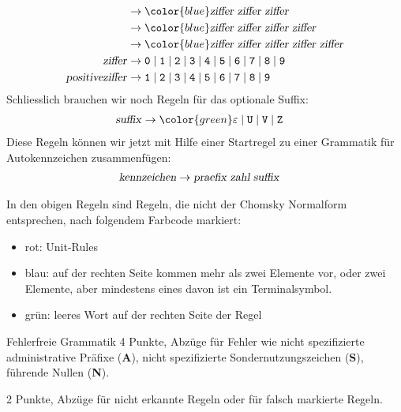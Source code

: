 \begin{loesung}
\begin{teilaufgaben}
\begin{align*}
&\rightarrow
{\color{blue}
\text{\textsl{ziffer}}\;
\text{\textsl{ziffer}}\;
\text{\textsl{ziffer}}}
\\
&\rightarrow
{\color{blue}
\text{\textsl{ziffer}}\;
\text{\textsl{ziffer}}\;
\text{\textsl{ziffer}}\;
\text{\textsl{ziffer}}}
\\
&\rightarrow
{\color{blue}
\text{\textsl{ziffer}}\;
\text{\textsl{ziffer}}\;
\text{\textsl{ziffer}}\;
\text{\textsl{ziffer}}\;
\text{\textsl{ziffer}}}
\\
\text{\textsl{ziffer}}
&\rightarrow
{\tt 0}\;|\;
{\tt 1}\;|\;
{\tt 2}\;|\;
{\tt 3}\;|\;
{\tt 4}\;|\;
{\tt 5}\;|\;
{\tt 6}\;|\;
{\tt 7}\;|\;
{\tt 8}\;|\;
{\tt 9}
\\
\text{\textsl{positiveziffer}}
&\rightarrow
{\tt 1}\;|\;
{\tt 2}\;|\;
{\tt 3}\;|\;
{\tt 4}\;|\;
{\tt 5}\;|\;
{\tt 6}\;|\;
{\tt 7}\;|\;
{\tt 8}\;|\;
{\tt 9}
\\
\end{align*}
Schliesslich brauchen wir noch Regeln für das optionale Suffix:
\begin{align*}
\text{\textsl{suffix}}
&\rightarrow{\color{green}\varepsilon} \;|\;
{\tt U} \;|\;
{\tt V} \;|\;
{\tt Z}
\end{align*}
Diese Regeln können wir jetzt mit Hilfe einer Startregel zu einer
Grammatik für Autokennzeichen zusammenfügen:
\begin{align*}
\text{\textsl{kennzeichen}}&\rightarrow
\text{\textsl{praefix}}\;\text{\textsl{zahl}}\;\text{\textsl{suffix}}
\end{align*}
\item In den obigen Regeln sind Regeln, die nicht der Chomsky Normalform
entsprechen, nach folgendem Farbcode markiert:
\begin{itemize}
\item {\color{red} rot}: Unit-Rules
\item {\color{blue} blau}: auf der rechten Seite kommen mehr als
zwei Elemente vor, oder zwei Elemente, aber mindestens eines davon
ist ein Terminalsymbol.
\item {\color{green} grün}: leeres Wort auf der rechten Seite der Regel
\qedhere
\end{itemize}
\end{teilaufgaben}
\end{loesung}

\begin{bewertung}
\begin{teilaufgaben}
\item Fehlerfreie Grammatik 4 Punkte, Abzüge für Fehler wie
nicht spezifizierte administrative Präfixe ({\bf A}), nicht spezifizierte
Sondernutzungszeichen ({\bf S}), führende Nullen ({\bf N}).
\item 2 Punkte, Abzüge für nicht erkannte Regeln oder für falsch
markierte Regeln.
\end{teilaufgaben}
\end{bewertung}

